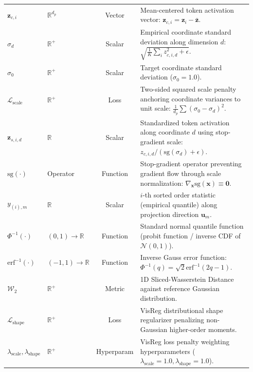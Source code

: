 \documentclass{article}
\begin{document}
\begin{table}[ht]
{\begin{tabular}{llcp{8.2cm}}
$\mathbf{z}_{c, i}$ & $\mathbb{R}^{d_p}$ & Vector & Mean-centered token activation vector: $\mathbf{z}_{c, i} = \mathbf{z}_i - \bar{\mathbf{z}}$. \\
$\sigma_d$ & $\mathbb{R}^+$ & Scalar & Empirical coordinate standard deviation along dimension $d$: $\sqrt{\frac{1}{K} \sum_{i} z_{c, i, d}^2 + \epsilon}$. \\
$\sigma_0$ & $\mathbb{R}^+$ & Scalar & Target coordinate standard deviation ($\sigma_0 = 1.0$). \\
$\mathcal{L}_{\text{scale}}$ & $\mathbb{R}^+$ & Loss & Two-sided squared scale penalty anchoring coordinate variances to unit scale: $\frac{1}{d_p} \sum (\sigma_0 - \sigma_d)^2$. \\
$\mathbf{z}_{s, i, d}$ & $\mathbb{R}$ & Scalar & Standardized token activation along coordinate $d$ using stop-gradient scale: $z_{c, i, d} / (\text{sg}(\sigma_d) + \epsilon)$. \\
$\text{sg}(\cdot)$ & Operator & Function & Stop-gradient operator preventing gradient flow through scale normalization: $\nabla_{\mathbf{x}} \text{sg}(\mathbf{x}) \equiv \mathbf{0}$. \\
$y_{(i), m}$ & $\mathbb{R}$ & Scalar & $i$-th sorted order statistic (empirical quantile) along projection direction $\mathbf{u}_m$. \\
$\Phi^{-1}(\cdot)$ & $(0, 1) \to \mathbb{R}$ & Function & Standard normal quantile function (probit function / inverse CDF of $\mathcal{N}(0, 1)$). \\
$\text{erf}^{-1}(\cdot)$ & $(-1, 1) \to \mathbb{R}$ & Function & Inverse Gauss error function: $\Phi^{-1}(q) = \sqrt{2} \text{erf}^{-1}(2q - 1)$. \\
$\mathcal{W}_2$ & $\mathbb{R}^+$ & Metric & 1D Sliced-Wasserstein Distance against reference Gaussian distribution. \\
$\mathcal{L}_{\text{shape}}$ & $\mathbb{R}^+$ & Loss & VisReg distributional shape regularizer penalizing non-Gaussian higher-order moments. \\
$\lambda_{\text{scale}}, \lambda_{\text{shape}}$ & $\mathbb{R}^+$ & Hyperparam & VisReg loss penalty weighting hyperparameters ($\lambda_{\text{scale}} = 1.0, \lambda_{\text{shape}} = 1.0$). \\
\bottomrule
\end{tabular}%
}
\end{table}
\end{document}
